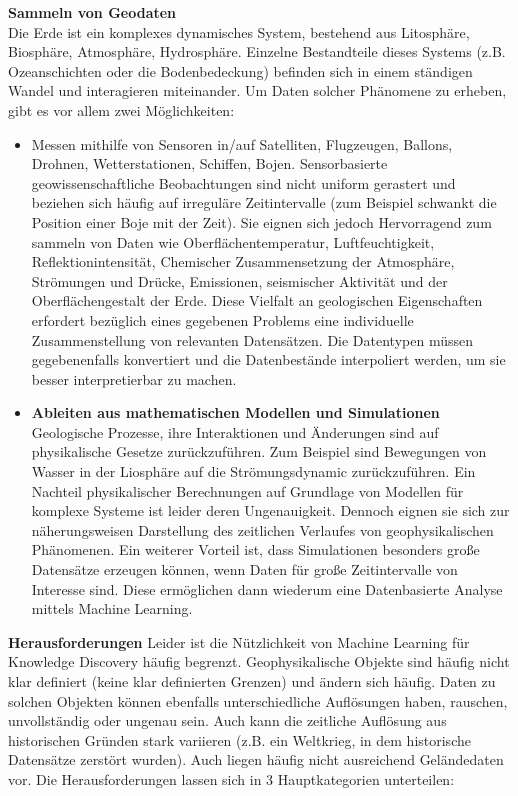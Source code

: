 \documentclass[11pt,ceqn]{book}
\begin{document}
\textbf{Sammeln von Geodaten}\\
Die Erde ist ein komplexes dynamisches System, bestehend aus Litosphäre, Biosphäre, Atmosphäre, Hydrosphäre. Einzelne Bestandteile dieses Systems (z.B. Ozeanschichten oder die Bodenbedeckung) befinden sich in einem ständigen Wandel und interagieren miteinander. Um Daten solcher Phänomene zu erheben, gibt es vor allem zwei Möglichkeiten:
\begin{itemize}
\item Messen mithilfe von Sensoren in/auf Satelliten, Flugzeugen, Ballons, Drohnen, Wetterstationen, Schiffen, Bojen.\newline
Sensorbasierte geowissenschaftliche Beobachtungen sind nicht uniform gerastert und beziehen sich häufig auf irreguläre Zeitintervalle (zum Beispiel schwankt die Position einer Boje mit der Zeit). Sie eignen sich jedoch Hervorragend zum sammeln von Daten wie Oberflächentemperatur, Luftfeuchtigkeit, Reflektionintensität, Chemischer Zusammensetzung der Atmosphäre, Strömungen und Drücke, Emissionen, seismischer Aktivität und der Oberflächengestalt der Erde. Diese Vielfalt an geologischen Eigenschaften erfordert bezüglich eines gegebenen Problems eine individuelle Zusammenstellung von relevanten Datensätzen. Die Datentypen müssen gegebenenfalls konvertiert und die Datenbestände interpoliert werden, um sie besser interpretierbar zu machen.

\item \textbf{Ableiten aus mathematischen Modellen und Simulationen}
Geologische Prozesse, ihre Interaktionen und Änderungen sind auf physikalische Gesetze zurückzuführen. Zum Beispiel sind Bewegungen von Wasser in der Liosphäre auf die Strömungsdynamic zurückzuführen. Ein Nachteil physikalischer Berechnungen auf Grundlage von Modellen für komplexe Systeme ist leider deren Ungenauigkeit. Dennoch eignen sie sich zur näherungsweisen Darstellung des zeitlichen Verlaufes von geophysikalischen Phänomenen. Ein weiterer Vorteil ist, dass Simulationen besonders große Datensätze erzeugen können, wenn Daten für große Zeitintervalle von Interesse sind. Diese ermöglichen dann wiederum eine Datenbasierte Analyse mittels Machine Learning.
\end{itemize}
\bigskip
\textbf{Herausforderungen}
Leider ist die Nützlichkeit von Machine Learning für Knowledge Discovery häufig begrenzt. Geophysikalische Objekte sind häufig nicht klar definiert (keine klar definierten Grenzen) und ändern sich häufig. Daten zu solchen Objekten können ebenfalls unterschiedliche Auflösungen haben, rauschen, unvollständig oder ungenau sein. Auch kann die zeitliche Auflösung aus historischen Gründen stark variieren (z.B. ein Weltkrieg, in dem historische Datensätze zerstört wurden). Auch liegen häufig nicht ausreichend Geländedaten vor. Die Herausforderungen lassen sich in 3 Hauptkategorien unterteilen:
\end{document}
